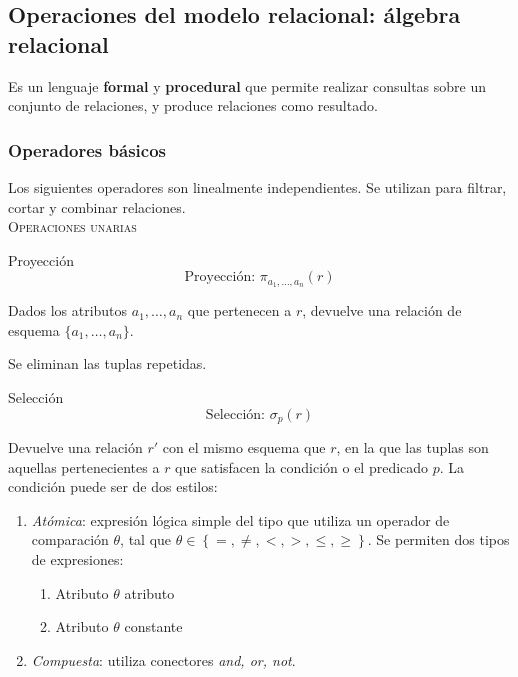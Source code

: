 \documentclass[a4paper, twoside]{article}
\begin{document}
\subsection{Operaciones del modelo relacional: álgebra relacional}
Es un lenguaje\textbf{ formal }y \textbf{procedural }que\textbf{ }permite realizar consultas sobre un conjunto de relaciones, y produce relaciones como resultado.

\subsubsection{Operadores básicos}
Los siguientes operadores son linealmente independientes. Se utilizan para filtrar,\emph{ }cortar y combinar relaciones.\\

{\Large \textsc{Operaciones unarias}}\\

\begin{definicion}[0.9\textwidth]{Proyección}
	\[
		\text{Proyección: } \pi_{a_{1},\dots,a_{n}}(r)
	\] 

	Dados los atributos $a_{1}, \dots, a_{n}$ que pertenecen a $r$, devuelve una relación de esquema $\{a_{1}, \dots, a_{n}\}$.

	Se eliminan las tuplas repetidas.
\end{definicion}

\begin{definicion}[0.9\textwidth]{Selección}
	\[
		\text{Selección: } \sigma_{p}(r)
	\] 

	Devuelve una relación $r'$ con el mismo esquema que $r$, en la que las tuplas son aquellas pertenecientes a $r$ que satisfacen la condición o el predicado $p$. La condición puede ser de dos estilos:
	\begin{enumerate}
		\item \emph{Atómica}: expresión lógica simple del tipo que utiliza un operador de comparación $\theta$, tal que $\theta\in\left\{ =,\neq,<,>,\leq,\geq\right\} $. Se permiten dos tipos de expresiones:
		\begin{enumerate}
			\item Atributo $\theta$ atributo
			\item Atributo $\theta$ constante
		\end{enumerate}
		\item \emph{Compuesta}: utiliza conectores \emph{and, or, not}.
	\end{enumerate}
\end{definicion}
\end{document}
